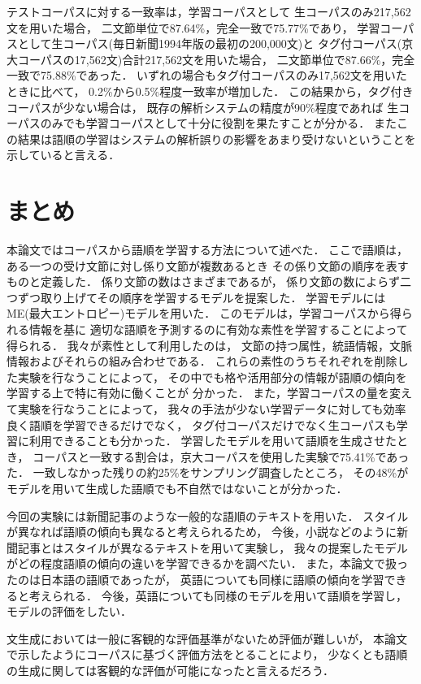テストコーパスに対する一致率は，学習コーパスとして
生コーパスのみ217,562文を用いた場合，
二文節単位で87.64\%，完全一致で75.77\%であり，
学習コーパスとして生コーパス(毎日新聞1994年版の最初の200,000文)と
タグ付コーパス(京大コーパスの17,562文)合計217,562文を用いた場合，
二文節単位で87.66\%，完全一致で75.88\%であった．
いずれの場合もタグ付コーパスのみ17,562文を用いたときに比べて，
0.2\%から0.5\%程度一致率が増加した．
この結果から，タグ付きコーパスが少ない場合は，
既存の解析システムの精度が90\%程度であれば
生コーパスのみでも学習コーパスとして十分に役割を果たすことが分かる．
またこの結果は語順の学習はシステムの解析誤りの影響をあまり受けないということを
示していると言える．

\section{まとめ}

本論文ではコーパスから語順を学習する方法について述べた．
ここで語順は，ある一つの受け文節に対し係り文節が複数あるとき
その係り文節の順序を表すものと定義した．
係り文節の数はさまざまであるが，
係り文節の数によらず二つずつ取り上げてその順序を学習するモデルを提案した．
学習モデルにはME(最大エントロピー)モデルを用いた．
このモデルは，学習コーパスから得られる情報を基に
適切な語順を予測するのに有効な素性を学習することによって得られる．
我々が素性として利用したのは，
文節の持つ属性，統語情報，文脈情報およびそれらの組み合わせである．
これらの素性のうちそれぞれを削除した実験を行なうことによって，
その中でも格や活用部分の情報が語順の傾向を学習する上で特に有効に働くことが
分かった．
また，学習コーパスの量を変えて実験を行なうことによって，
我々の手法が少ない学習データに対しても効率良く語順を学習できるだけでなく，
タグ付コーパスだけでなく生コーパスも学習に利用できることも分かった．
学習したモデルを用いて語順を生成させたとき，
コーパスと一致する割合は，京大コーパスを使用した実験で75.41\%であった．
一致しなかった残りの約25\%をサンプリング調査したところ，
その48\%がモデルを用いて生成した語順でも不自然ではないことが分かった．

今回の実験には新聞記事のような一般的な語順のテキストを用いた．
スタイルが異なれば語順の傾向も異なると考えられるため，
今後，小説などのように新聞記事とはスタイルが異なるテキストを用いて実験し，
我々の提案したモデルがどの程度語順の傾向の違いを学習できるかを調べたい．
また，本論文で扱ったのは日本語の語順であったが，
英語についても同様に語順の傾向を学習できると考えられる．
今後，英語についても同様のモデルを用いて語順を学習し，モデルの評価をしたい．

文生成においては一般に客観的な評価基準がないため評価が難しいが，
本論文で示したようにコーパスに基づく評価方法をとることにより，
少なくとも語順の生成に関しては客観的な評価が可能になったと言えるだろう．

